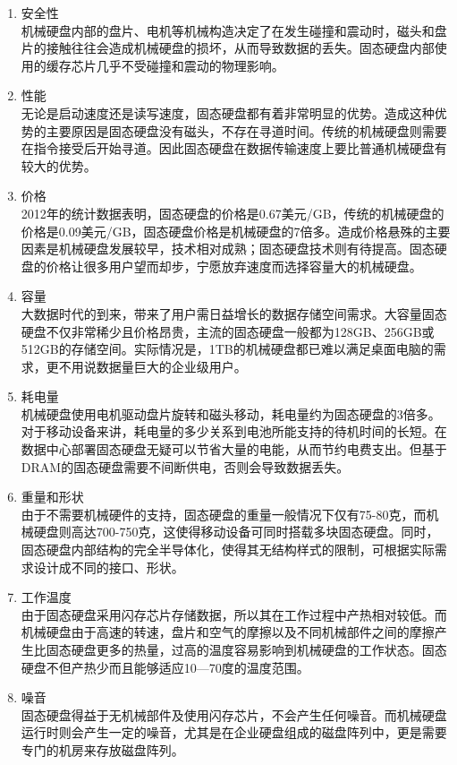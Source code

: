 \begin{enumerate}
\item 安全性
\\机械硬盘内部的盘片、电机等机械构造决定了在发生碰撞和震动时，磁头和盘片的接触往往会造成机械硬盘的损坏，从而导致数据的丢失。固态硬盘内部使用的缓存芯片几乎不受碰撞和震动的物理影响。
\item 性能
\\无论是启动速度还是读写速度，固态硬盘都有着非常明显的优势。造成这种优势的主要原因是固态硬盘没有磁头，不存在寻道时间。传统的机械硬盘则需要在指令接受后开始寻道。因此固态硬盘在数据传输速度上要比普通机械硬盘有较大的优势。
\item 价格
\\2012年的统计数据表明，固态硬盘的价格是0.67美元/GB，传统的机械硬盘的价格是0.09美元/GB，固态硬盘价格是机械硬盘的7倍多。造成价格悬殊的主要因素是机械硬盘发展较早，技术相对成熟；固态硬盘技术则有待提高。固态硬盘的价格让很多用户望而却步，宁愿放弃速度而选择容量大的机械硬盘。
\item 容量
\\大数据时代的到来，带来了用户需日益增长的数据存储空间需求。大容量固态硬盘不仅非常稀少且价格昂贵，主流的固态硬盘一般都为128GB、256GB或512GB的存储空间。实际情况是，1TB的机械硬盘都已难以满足桌面电脑的需求，更不用说数据量巨大的企业级用户。
\item 耗电量
\\机械硬盘使用电机驱动盘片旋转和磁头移动，耗电量约为固态硬盘的3倍多。对于移动设备来讲，耗电量的多少关系到电池所能支持的待机时间的长短。在数据中心部署固态硬盘无疑可以节省大量的电能，从而节约电费支出。但基于DRAM的固态硬盘需要不间断供电，否则会导致数据丢失。
\item 重量和形状
\\由于不需要机械硬件的支持，固态硬盘的重量一般情况下仅有75-80克，而机械硬盘则高达700-750克，这使得移动设备可同时搭载多块固态硬盘。同时，固态硬盘内部结构的完全半导体化，使得其无结构样式的限制，可根据实际需求设计成不同的接口、形状。
\item 工作温度
\\由于固态硬盘采用闪存芯片存储数据，所以其在工作过程中产热相对较低。而机械硬盘由于高速的转速，盘片和空气的摩擦以及不同机械部件之间的摩擦产生比固态硬盘更多的热量，过高的温度容易影响到机械硬盘的工作状态。固态硬盘不但产热少而且能够适应10—70度的温度范围。
\item 噪音
\\ 固态硬盘得益于无机械部件及使用闪存芯片，不会产生任何噪音。而机械硬盘运行时则会产生一定的噪音，尤其是在企业硬盘组成的磁盘阵列中，更是需要专门的机房来存放磁盘阵列。
\end{enumerate}

